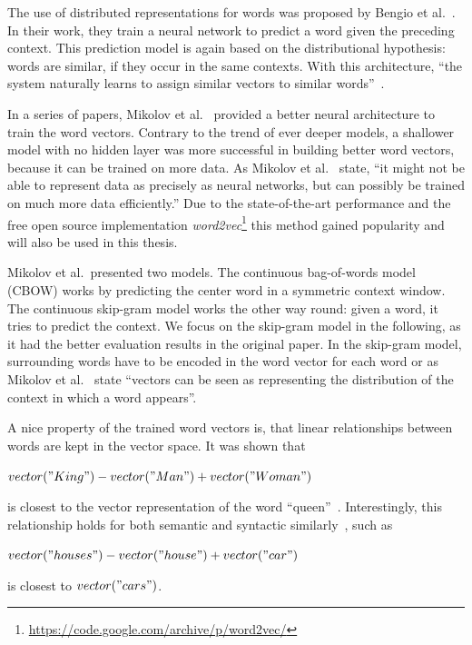 \documentclass[
        a4paper,
        titlepage,
        twoside,
        parskip
        ]{scrbook}
\theoremstyle{break}
\begin{document}
The use of distributed representations for words was proposed by Bengio et al.~\cite{Bengio2003}.
In their work, they train a neural network to predict a word given the preceding context.
This prediction model is again based on the distributional hypothesis: words are similar, if they occur in the same contexts.
With this architecture, ``the system naturally learns to assign similar vectors to similar words''~\cite{Baroni2014}.

In a series of papers, Mikolov et al.~\cite{Mikolov2013,Mikolov2013a,Mikolov2013b} provided a better neural architecture to train the word vectors.
Contrary to the trend of ever deeper models, a shallower model with no hidden layer was more successful in building better word vectors, because it can be trained on more data.
As Mikolov et al.~\cite{Mikolov2013a} state, ``it might not be able to represent data as precisely as neural networks, but can possibly be trained on much more data efficiently.''
Due to the state-of-the-art performance and the free open source implementation \emph{word2vec}\footnote{\url{https://code.google.com/archive/p/word2vec/}} this method gained popularity and will also be used in this thesis.

Mikolov et al.\ presented two models.
The continuous bag-of-words model (CBOW) works by predicting the center word in a symmetric context window.
The continuous skip-gram model works the other way round: given a word, it tries to predict the context.
We focus on the skip-gram model in the following, as it had the better evaluation results in the original paper.
In the skip-gram model, surrounding words have to be encoded in the word vector for each word or as Mikolov et al.~\cite{Mikolov2013} state ``vectors can be seen as representing the distribution of the context in which a word appears''.

A nice property of the trained word vectors is, that linear relationships between words are kept in the vector space.
It was shown that
\begin{center}
       $vector("King") - vector("Man") + vector("Woman")$
\end{center}
is closest to the vector representation of the word ``queen''~\cite{Mikolov2013b}.
Interestingly, this relationship holds for both semantic and syntactic similarly~\cite{Mikolov2013a}, such as
\begin{center}
       $vector("houses") - vector("house") + vector("car")$
\end{center}
is closest to $vector("cars")$.
\end{document}
